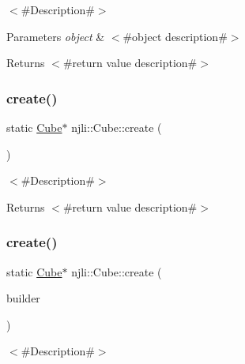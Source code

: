 $<$\#\+Description\#$>$


\begin{DoxyParams}{Parameters}
{\em object} & $<$\#object description\#$>$\\
\hline
\end{DoxyParams}
\begin{DoxyReturn}{Returns}
$<$\#return value description\#$>$ 
\end{DoxyReturn}
\mbox{\label{classnjli_1_1_cube_a1d95c5c13758c11235c31811f4590eac}} 
\subsubsection{\texorpdfstring{create()}{create()}\hspace{0.1cm}{\footnotesize\ttfamily [1/2]}}
{\footnotesize\ttfamily static \mbox{\hyperlink{classnjli_1_1_cube}{Cube}}$\ast$ njli\+::\+Cube\+::create (\begin{DoxyParamCaption}{ }\end{DoxyParamCaption})\hspace{0.3cm}{\ttfamily [static]}}

$<$\#\+Description\#$>$

\begin{DoxyReturn}{Returns}
$<$\#return value description\#$>$ 
\end{DoxyReturn}
\mbox{\label{classnjli_1_1_cube_a16ae2ea03d7ffbafc57b9ce92bd4b834}} 
\subsubsection{\texorpdfstring{create()}{create()}\hspace{0.1cm}{\footnotesize\ttfamily [2/2]}}
{\footnotesize\ttfamily static \mbox{\hyperlink{classnjli_1_1_cube}{Cube}}$\ast$ njli\+::\+Cube\+::create (\begin{DoxyParamCaption}\item[{const \mbox{\hyperlink{classnjli_1_1_cube_builder}{Cube\+Builder}} \&}]{builder }\end{DoxyParamCaption})\hspace{0.3cm}{\ttfamily [static]}}

$<$\#\+Description\#$>$


